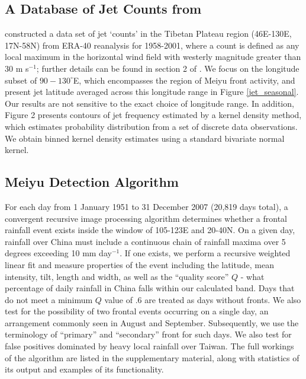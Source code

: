 \documentclass[draft,grl]{AGUTeX}
\begin{document}
\begin{article}
\subsection{A Database of Jet Counts from \citet{Schiemann2009}} 

	\citet{Schiemann2009} constructed a data set of jet `counts' in the Tibetan Plateau region (46\textdegree E-130\textdegree E, 17\textdegree N-58\textdegree N) from ERA-40 reanalysis for 1958-2001, where a count is defined as any local maximum in the horizontal wind field with westerly magnitude greater than $30$ m s$^{-1}$; further details can be found in section 2 of \citet{Schiemann2009}. We focus on the longitude subset of $90-130^\circ$E, which encompasses the region of Meiyu front activity, and present jet latitude averaged across this longitude range in Figure \ref{jet_seasonal}. Our results are not sensitive to the exact choice of longitude range. In addition, Figure 2 presents contours of jet frequency estimated by a kernel density method, which estimates probability distribution from a set of discrete data observations. We obtain binned kernel density estimates using a standard bivariate normal kernel. 
	
\subsection{Meiyu Detection Algorithm}

	For each day from 1 January 1951 to 31 December 2007 (20,819 days total), a convergent recursive image processing algorithm determines whether a frontal rainfall event exists inside the window of 105-123E and 20-40N. On a given day, rainfall over China must include a continuous chain of rainfall maxima over 5 degrees exceeding 10 mm day$^{-1}$. If one exists, we perform a recursive weighted linear fit and measure properties of the event including the latitude, mean intensity, tilt, length and width, as well as the ``quality score'' $Q$ - what percentage of daily rainfall in China falls within our calculated band. Days that do not meet a minimum $Q$ value of .6 are treated as days without fronts. We also test for the possibility of two frontal events occurring on a single day, an arrangement commonly seen in August and September. Subsequently, we use the terminology of ``primary'' and ``secondary'' front for such days. We also test for false positives dominated by heavy local rainfall over Taiwan. The full workings of the algorithm are listed in the supplementary material, along with statistics of its output and examples of its functionality.


\end{article}
\end{document}
